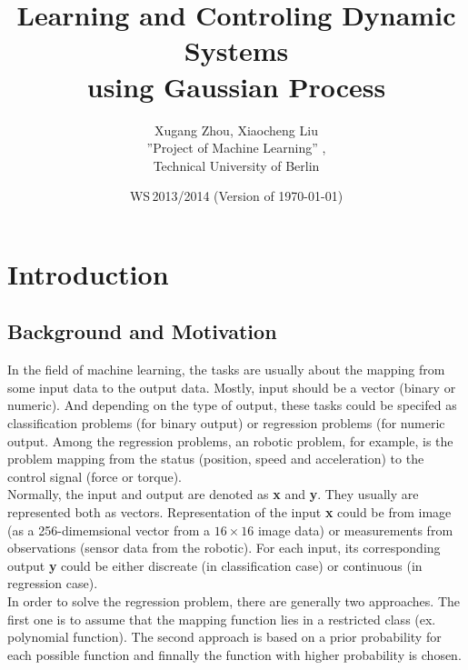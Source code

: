 \documentclass[11pt,twoside,a4paper]{article}
\begin{document}
\title{Learning and Controling Dynamic Systems \\using Gaussian Process}
\author{Xugang Zhou, Xiaocheng Liu \\
  ''Project of Machine Learning'' , \\
  Technical University of Berlin
}
  
\date{WS\,2013/2014 (Version of \today)}

\maketitle


\section{Introduction}
\subsection{Background and Motivation}

In the field of machine learning, the tasks are usually about the mapping from
some input data to the output data. Mostly, input should be a vector
(binary or numeric). And depending on the type of output, these
tasks could be specifed as classification problems (for binary output)
or regression problems (for numeric output.  Among the regression
problems, an robotic problem, for example, is the problem mapping from
the status (position, speed and acceleration) to the control signal
(force or torque).\\

Normally, the input and output are denoted as \textbf{x} and \textbf{y}. They
usually are represented both as vectors. Representation of the input
\textbf{x} could be from image (as a 256-dimemsional vector from a $16
\times 16$ image data) or measurements from observations (sensor data
from the robotic). For each input, its corresponding output \textbf{y} could be either
discreate (in classification case) or continuous (in regression
case).\\

In order to solve the regression problem, there are generally two
approaches. The first one is to assume that the mapping function lies in a
restricted class (ex. polynomial function). The second approach is
based on a prior probability for each possible function and finnally
the function with higher probability is chosen.\\
\end{document}
